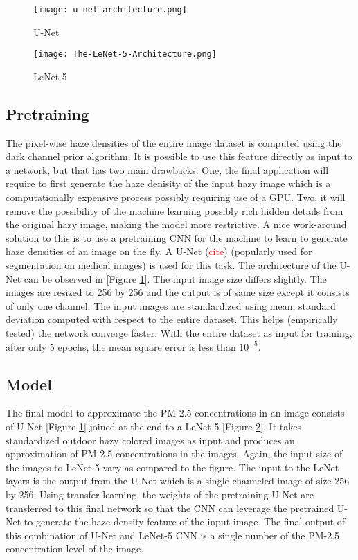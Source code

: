 \documentclass{article}
\begin{document}
\begin{figure}[H]
  \centering
  \texttt{[image: u-net-architecture.png]}
  \caption{U-Net}
  \label{U-Net}
\end{figure}
\begin{figure}[H]
  \centering
  \texttt{[image: The-LeNet-5-Architecture.png]}
  \caption{LeNet-5}
  \label{LeNet-5}
\end{figure}

\newpage
\subsection{Pretraining}
The pixel-wise haze densities of the entire image dataset is computed using the dark channel prior algorithm. It is possible to use this feature directly as input to a network, but that has two main drawbacks. One, the final application will require to first generate the haze denisity of the input hazy image which is a computationally expensive process possibly requiring use of a GPU. Two, it will remove the possibility of the machine learning possibly rich hidden details from the original hazy image, making the model more restrictive. A nice work-around solution to this is to use a pretraining CNN for the machine to learn to generate haze densities of an image on the fly. A U-Net (\textcolor{red}{cite}) (popularly used for segmentation on medical images) is used for this task. The architecture of the U-Net can be observed in [Figure \ref{U-Net}]. The input image size differs slightly. The images are resized to 256 by 256 and the output is of same size except it consists of only one channel. The input images are standardized using mean, standard deviation computed with respect to the entire dataset. This helps (empirically tested) the network converge faster. With the entire dataset as input for training, after only 5 epochs, the mean square error is less than $10^{-5}$.

\subsection{Model}

The final model to approximate the PM-2.5 concentrations in an image consists of U-Net [Figure \ref{U-Net}] joined at the end to a LeNet-5 [Figure \ref{LeNet-5}]. It takes standardized outdoor hazy colored images as input and produces an approximation of PM-2.5 concentrations in the images. Again, the input size of the images to LeNet-5 vary as compared to the figure. The input to the LeNet layers is the output from the U-Net which is a single channeled image of size 256 by 256. Using transfer learning, the weights of the pretraining U-Net are transferred to this final network so that the CNN can leverage the pretrained U-Net to generate the haze-density feature of the input image. The final output of this combination of U-Net and LeNet-5 CNN is a single number of the PM-2.5 concentration level of the image.
\end{document}
